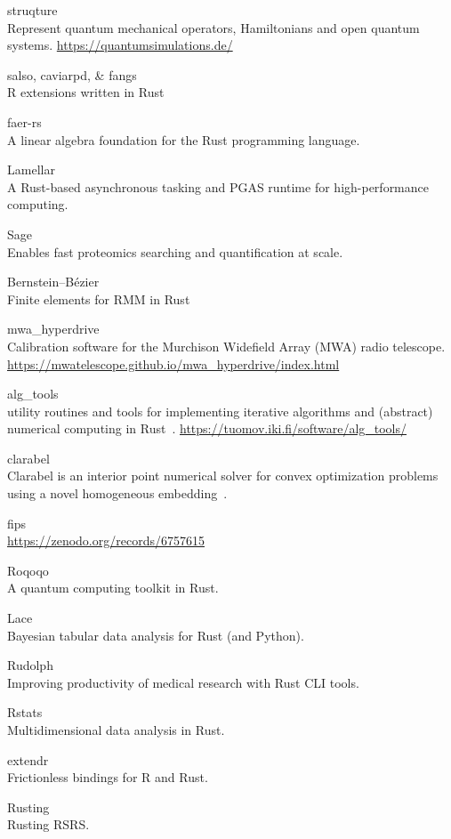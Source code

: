 \documentclass{article}
\begin{document}
struqture\\
Represent quantum mechanical operators, Hamiltonians and open quantum systems.
\url{https://quantumsimulations.de/}

salso, caviarpd, \& fangs\\
R extensions written in Rust

faer-rs\\
A linear algebra foundation for the Rust programming language.

Lamellar\\
A Rust-based asynchronous tasking and PGAS runtime for high-performance computing.

Sage\\
Enables fast proteomics searching and quantification at scale.

Bernstein–Bézier\\
Finite elements for RMM in Rust~\cite{Sky2024}

mwa\_hyperdrive\\
Calibration software for the Murchison Widefield Array (MWA) radio telescope.
\url{https://mwatelescope.github.io/mwa_hyperdrive/index.html}

alg\_tools\\
utility routines and tools for implementing iterative algorithms and (abstract)
numerical computing in Rust~\cite{Valkonen2023}. \url{https://tuomov.iki.fi/software/alg_tools/}

clarabel\\
Clarabel is an interior point numerical solver for convex optimization problems using a
novel homogeneous embedding~\cite{Clarabel_2024}.

fips\\
\cite{jeggle2023genericframeworkdataracefreemanyparticle}
\url{https://zenodo.org/records/6757615}

Roqoqo\\
A quantum computing toolkit in Rust.

Lace\\
Bayesian tabular data analysis for Rust (and Python).

Rudolph\\
Improving productivity of medical research with Rust CLI tools.

Rstats\\
Multidimensional data analysis in Rust.

extendr\\
Frictionless bindings for R and Rust.

Rusting\\
Rusting RSRS.
\end{document}

